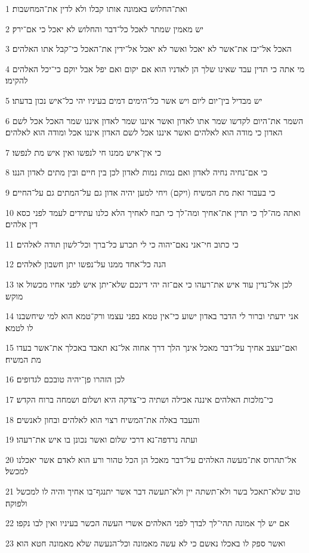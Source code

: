\par 1 ואת־החלוש באמונה אותו קבלו ולא לדין את־המחשבות׃
\par 2 יש מאמין שמתר לאכל כל־דבר והחלוש לא יאכל כי אם־ירק׃
\par 3 האכל אל־יבז את־אשר לא יאכל ואשר לא יאכל אל־ידין את־האכל כי־קבל אתו האלהים׃
\par 4 מי אתה כי תדין עבד שאינו שלך הן לאדניו הוא אם יקום ואם יפל אבל יוקם כי־יכל האלהים להקימו׃
\par 5 יש מבדיל בין־יום ליום ויש אשר כל־הימים דמים בעיניו יהי כל־איש נכון בדעתו׃
\par 6 השמר את־היום לקדשו שמר אתו לאדון ואשר איננו שמר לאדון איננו שמר האכל אכל לשם האדון כי מודה הוא לאלהים ואשר איננו אכל לשם האדון איננו אכל ומודה הוא לאלהים׃
\par 7 כי אין־איש ממנו חי לנפשו ואין איש מת לנפשו׃
\par 8 כי אם־נחיה נחיה לאדון ואם נמות נמות לאדון לכן בין חיים ובין מתים לאדון הננו׃
\par 9 כי בעבור זאת מת המשיח (ויקם) ויחי למען יהיה אדון גם על־המתים גם על־החיים׃
\par 10 ואתה מה־לך כי תדין את־אחיך ומה־לך כי תבוז לאחיך הלא כלנו עתידים לעמד לפני כסא דין אלהים׃
\par 11 כי כתוב חי־אני נאם־יהוה כי לי תכרע כל־ברך וכל־לשון תודה לאלהים׃
\par 12 הנה כל־אחד ממנו על־נפשו יתן חשבון לאלהים׃
\par 13 לכן אל־נדין עוד איש את־רעהו כי אם־זה יהי דינכם שלא־יתן איש לפני אחיו מכשול או מוקש׃
\par 14 אני ידעתי וברור לי הדבר באדון ישוע כי־אין טמא בפני עצמו ורק־טמא הוא למי שיחשבנו לו לטמא׃
\par 15 ואם־יעצב אחיך על־דבר מאכל אינך הלך דרך אחוה אל־נא תאבד באכלך את־אשר בעדו מת המשיח׃
\par 16 לכן הזהרו פן־יהיה טובכם לגדופים׃
\par 17 כי־מלכות האלהים איננה אכילה ושתיה כי־צדקה היא ושלום ושמחה ברוח הקדש׃
\par 18 והעבד באלה את־המשיח רצוי הוא לאלהים ובחון לאנשים׃
\par 19 ועתה נרדפה־נא דרכי שלום ואשר נכונן בו איש את־רעהו׃
\par 20 אל־תהרוס את־מעשה האלהים על־דבר מאכל הן הכל טהור ורע הוא לאדם אשר יאכלנו למכשל׃
\par 21 טוב שלא־תאכל בשר ולא־תשתה יין ולא־תעשה דבר אשר יתנגף־בו אחיך והיה לו למכשל ולפוקה׃
\par 22 אם יש לך אמונה תהי־לך לבדך לפני האלהים אשרי העשה הכשר בעיניו ואין לבו נקפו׃
\par 23 ואשר ספק לו באכלו נאשם כי לא עשה מאמונה וכל־הנעשה שלא מאמונה חטא הוא׃

